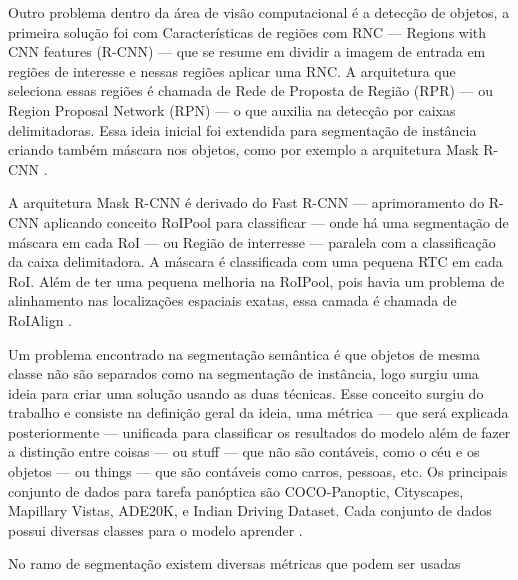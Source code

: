 
Outro problema dentro da área de visão computacional é a detecção de objetos, a primeira solução foi com Características de regiões com RNC — Regions with CNN features (R-CNN) — que se resume em dividir a imagem de entrada em regiões de interesse e nessas regiões aplicar uma RNC. A arquitetura que seleciona essas regiões é chamada de Rede de Proposta de Região (RPR) — ou Region Proposal Network (RPN) — o que auxilia na detecção por caixas delimitadoras. Essa ideia inicial foi extendida para segmentação de instância criando também máscara nos objetos, como por exemplo a arquitetura Mask R-CNN \space\cite{dp_semantic_segmantation, lapix}.

A arquitetura Mask R-CNN é derivado do Fast R-CNN — aprimoramento do R-CNN aplicando conceito RoIPool para classificar — onde há uma segmentação de máscara em cada RoI — ou Região de interresse — paralela com a classificação da caixa delimitadora. A máscara é classificada com uma pequena RTC em cada RoI. Além de ter uma pequena melhoria na RoIPool, pois havia um problema de alinhamento nas localizações espaciais exatas, essa camada é chamada de RoIAlign \space\cite{maskRCNN}.


Um problema encontrado na segmentação semântica é que objetos de mesma classe não são separados como na segmentação de instância, logo surgiu uma ideia para criar uma solução usando as duas técnicas. Esse conceito surgiu do trabalho \space{} e consiste na definição geral da ideia, uma métrica — que será explicada posteriormente — unificada para classificar os resultados do modelo além de fazer a distinção entre coisas — ou stuff — que não são contáveis, como o céu e os objetos — ou things — que são contáveis como carros, pessoas, etc.
Os principais conjunto de dados para tarefa panóptica são COCO-Panoptic, Cityscapes, Mapillary Vistas, ADE20K, e Indian Driving Dataset. Cada conjunto de dados possui diversas classes para o modelo aprender \space\cite{v7labs2022panoptic}.


No ramo de segmentação existem diversas métricas que podem ser usadas


